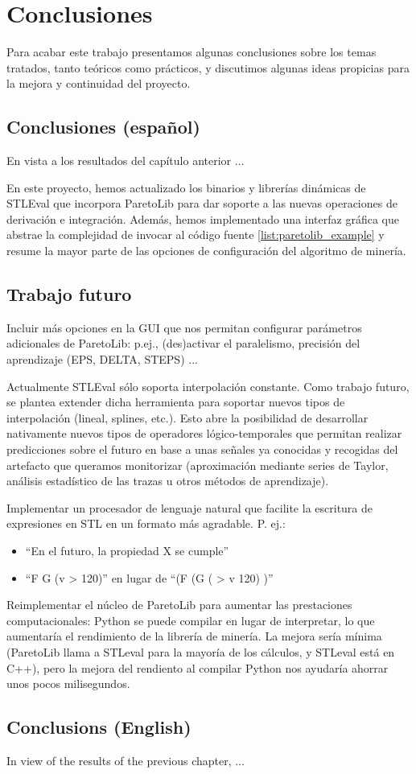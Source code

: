 \chapter{Conclusiones}
\label{cha:concl}
Para acabar este trabajo presentamos algunas conclusiones sobre los temas tratados, tanto teóricos como prácticos, y discutimos algunas ideas propicias para la mejora y continuidad del proyecto.
\section{Conclusiones (español)}
En vista a los resultados del capítulo anterior $\ldots$

En este proyecto, hemos actualizado los binarios y librerías dinámicas de STLEval que incorpora ParetoLib para dar soporte a las nuevas operaciones de derivación e integración. Además, hemos implementado una interfaz gráfica que abstrae la complejidad de invocar al código fuente \ref{list:paretolib_example} y resume la mayor parte de las opciones de configuración del algoritmo de minería.

\section{Trabajo futuro}

Incluir más opciones en la GUI que nos permitan configurar parámetros adicionales de ParetoLib: p.ej., (des)activar el paralelismo, precisión del aprendizaje (EPS, DELTA, STEPS) ...

Actualmente STLEval sólo soporta interpolación constante. Como trabajo futuro, se plantea extender dicha herramienta para soportar nuevos tipos de interpolación (lineal, splines, etc.). Esto abre la posibilidad de desarrollar nativamente nuevos tipos de operadores lógico-temporales que permitan realizar predicciones sobre el futuro en base a unas señales ya conocidas y recogidas del artefacto que queramos monitorizar (aproximación mediante series de Taylor, análisis estadístico de las trazas u otros métodos de aprendizaje).

Implementar un procesador de lenguaje natural que facilite la escritura de expresiones en STL en un formato más agradable. P. ej.:
\begin{itemize}
 \item ``En el futuro, la propiedad X se cumple''
 \item ``F G (v > 120)'' en lugar de ``(F (G ( > v 120) )''
\end{itemize}

Reimplementar el núcleo de ParetoLib para aumentar las prestaciones computacionales: Python se puede compilar en lugar de interpretar, lo que aumentaría el rendimiento de la librería de minería. La mejora sería mínima (ParetoLib llama a STLeval para la mayoría de los cálculos, y STLeval está en C++), pero la mejora del rendiento al compilar Python nos ayudaría ahorrar unos pocos milisegundos.

\section{Conclusions (English)}
In view of the results of the previous chapter, $\ldots$



